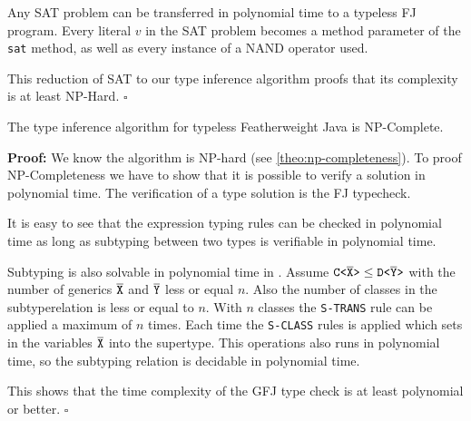 Any SAT problem can be transferred in polynomial time to a typeless FJ program.
Every literal $v$ in the SAT problem becomes a method parameter of the \texttt{sat} method, as well as every instance of a NAND operator used.

This reduction of SAT to our type inference algorithm proofs that its
complexity is at least NP-Hard.
\hfill $\square$

\begin{theorem}[NP-Completeness]
  \label{theo:np-completeness}
  The type inference algorithm for typeless Featherweight Java is NP-Complete.
\end{theorem}

\textbf{Proof:} We know the algorithm is NP-hard (see \ref{theo:np-completeness}).
To proof NP-Completeness we have to show that it is possible to verify a solution in polynomial time.
The verification of a type solution is the FJ typecheck.

It is easy to see that the expression typing rules can be checked in polynomial time as long as subtyping between two types is verifiable in polynomial time.

Subtyping is also solvable in polynomial time in \TFGJ{}.
Assume $\mathtt{C \texttt{<} \overline{\tt X} \texttt{>} } \leq \mathtt{D \texttt{<} \overline{\tt Y} \texttt{>} }$ with the number of generics $\overline{\tt X}$ and $\overline{\tt Y}$ less or equal $n$.
Also the number of classes in the subtyperelation is less or equal to $n$.
With $n$ classes the \texttt{S-TRANS} rule can be applied a maximum of $n$ times.
Each time the \texttt{S-CLASS} rules is applied which sets in the variables $\overline{\tt X}$ into the supertype.
This operations also runs in polynomial time, so the subtyping relation is decidable in polynomial time.

This shows that the time complexity of the GFJ type check is at least
polynomial or better. 
\hfill $\square$


